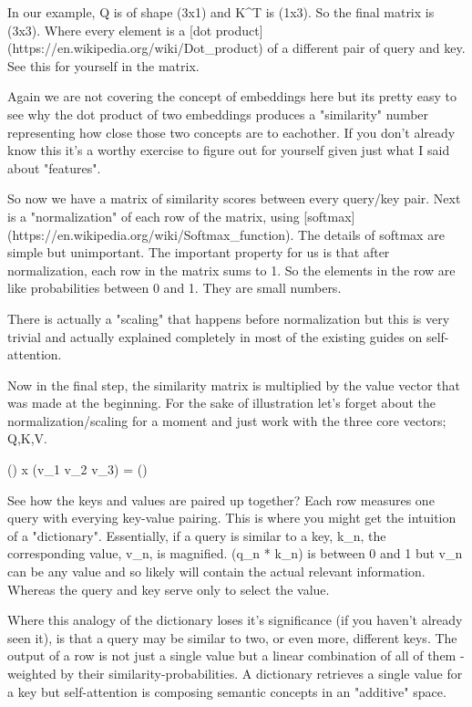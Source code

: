 In our example, Q is of shape (3x1) and K^T is (1x3). So the final matrix is (3x3). Where every element is a [dot product](https://en.wikipedia.org/wiki/Dot_product) of a different pair of query and key. See this for yourself in the matrix.

Again we are not covering the concept of embeddings here but its pretty easy to see why the dot product of two embeddings produces a "similarity" number representing how close those two concepts are to eachother. If you don't already know this it's a worthy exercise to figure out for yourself given just what I said about "features".

So now we have a matrix of similarity scores between every query/key pair. Next is a "normalization" of each row of the matrix, using [softmax](https://en.wikipedia.org/wiki/Softmax_function). The details of softmax are simple but unimportant. The important property for us is that after normalization, each row in the matrix sums to 1. So the elements in the row are like probabilities between 0 and 1. They are small numbers.

There is actually a "scaling" that happens before normalization but this is very trivial and actually explained completely in most of the existing guides on self-attention.

Now in the final step, the similarity matrix is multiplied by the value vector that was made at the beginning. For the sake of illustration let's forget about the normalization/scaling for a moment and just work with the three core vectors; Q,K,V.

() x (v_1 v_2 v_3) = ()

See how the keys and values are paired up together? Each row measures one query with everying key-value pairing. This is where you might get the intuition of a "dictionary". Essentially, if a query is similar to a key, k_n, the corresponding value, v_n, is magnified. (q_n * k_n) is between 0 and 1 but v_n can be any value and so likely will contain the actual relevant information. Whereas the query and key serve only to select the value.

Where this analogy of the dictionary loses it's significance (if you haven't already seen it), is that a query may be similar to two, or even more, different keys. The output of a row is not just a single value but a linear combination of all of them - weighted by their similarity-probabilities. A dictionary retrieves a single value for a key but self-attention is composing semantic concepts in an "additive" space.

